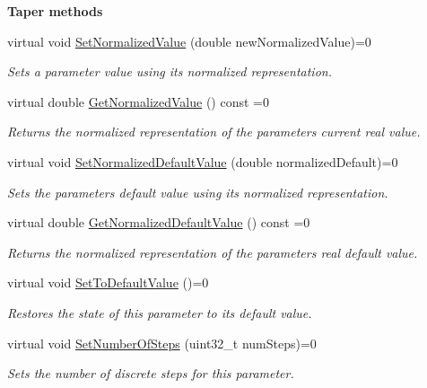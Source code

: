\begin{Indent}\textbf{ Taper methods}\par
\begin{DoxyCompactItemize}
\item 
virtual void \mbox{\hyperlink{a01857_ad4b9a53e4e972d1a840ef094036e5a70}{Set\+Normalized\+Value}} (double new\+Normalized\+Value)=0
\begin{DoxyCompactList}\small\item\em Sets a parameter value using it\textquotesingle{}s normalized representation. \end{DoxyCompactList}\item 
virtual double \mbox{\hyperlink{a01857_a32bc181c17b36fc52736d4d816c56907}{Get\+Normalized\+Value}} () const =0
\begin{DoxyCompactList}\small\item\em Returns the normalized representation of the parameter\textquotesingle{}s current real value. \end{DoxyCompactList}\item 
virtual void \mbox{\hyperlink{a01857_a42ce03269f84f46d5af70ac198727052}{Set\+Normalized\+Default\+Value}} (double normalized\+Default)=0
\begin{DoxyCompactList}\small\item\em Sets the parameter\textquotesingle{}s default value using its normalized representation. \end{DoxyCompactList}\item 
virtual double \mbox{\hyperlink{a01857_a6e645417c9296b3dd12a95cfb45babb9}{Get\+Normalized\+Default\+Value}} () const =0
\begin{DoxyCompactList}\small\item\em Returns the normalized representation of the parameter\textquotesingle{}s real default value. \end{DoxyCompactList}\item 
virtual void \mbox{\hyperlink{a01857_a29da0f77778437b19f1c8a666558357a}{Set\+To\+Default\+Value}} ()=0
\begin{DoxyCompactList}\small\item\em Restores the state of this parameter to its default value. \end{DoxyCompactList}\item 
virtual void \mbox{\hyperlink{a01857_ac81903d0388a03045a57dd4c455b6f02}{Set\+Number\+Of\+Steps}} (uint32\+\_\+t num\+Steps)=0
\begin{DoxyCompactList}\small\item\em Sets the number of discrete steps for this parameter. \end{DoxyCompactList}\item 

\end{DoxyCompactItemize}
\end{Indent}
